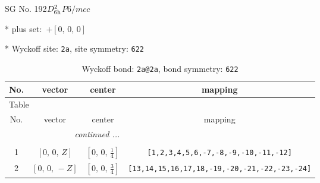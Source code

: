 \documentclass[fleqn,8pt]{jsarticle}
\begin{document}
\setcounter{MaxMatrixCols}{32}

\renewcommand{\tablename}{Table~}
\renewcommand{\figurename}{Figure~}
\begin{center}
\LARGE
SG No. 192\quad$D_{\rm 6h}^{2}$\quad$P6/mcc$\quad[ hexagonal ]
\end{center}

* plus set:\,\,\,$+\left[ 0,\, 0,\, 0 \right]$


* Wyckoff site: {\tt 2a}, site symmetry: {\tt 622}
\renewcommand{\arraystretch}{1.2}
\begin{longtable}{cccc}
\caption{Wyckoff bond: {\tt 2a@2a}, bond symmetry: {\tt 622}}
 \\
 \hline \hline
No. & vector & center & mapping \\ \hline \endfirsthead

\multicolumn{3}{l}{\tablename\ \thetable{}} \\
 \hline \hline
No. & vector & center & mapping \\ \hline \endhead

 \hline \hline
\multicolumn{3}{r}{\footnotesize\it continued ...} \\ \endfoot

 \hline \hline
\multicolumn{3}{r}{} \\ \endlastfoot

1 & $\left[ 0,\, 0,\, Z \right]$ & $\left[ 0,\, 0,\, \frac{1}{4} \right]$ & {\tt [1,2,3,4,5,6,-7,-8,-9,-10,-11,-12]} \\ \hline
2 & $\left[ 0,\, 0,\, - Z \right]$ & $\left[ 0,\, 0,\, \frac{3}{4} \right]$ & {\tt [13,14,15,16,17,18,-19,-20,-21,-22,-23,-24]} \\
\end{longtable}
\renewcommand{\arraystretch}{1.2}
\end{document}
